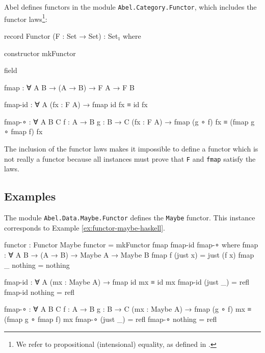 Abel defines functors in the module \texttt{Abel.Category.Functor},
which includes the functor laws\footnote{We refer to propositional
  (intensional) equality, as defined in \parencite[module
    \texttt{Relation.Binary.PropositionalEquality}]{danielsson-2013}.}:
\begin{codeagda}
  record Functor (F : Set → Set) : Set₁ where

    constructor mkFunctor

    field

      fmap    : ∀ {A B} → (A → B) → F A → F B

      fmap-id : ∀ {A} (fx : F A) → fmap id fx ≡ id fx

      fmap-∘  : ∀ {A B C} {f : A → B} {g : B → C}
                (fx : F A) → fmap (g ∘ f) fx ≡ (fmap g ∘ fmap f) fx
\end{codeagda}
The inclusion of the functor laws makes it impossible to define a
functor which is not really a functor because all instances must prove
that \texttt{F} and \texttt{fmap} satisfy the laws.


\subsection{Examples}
\label{sec:functors-agda-examples}

\begin{example}
  \label{ex:functors-agda-maybe}
  The module \texttt{Abel.Data.Maybe.Functor} defines the
  \texttt{Maybe} functor. This instance corresponds to Example
  \ref{ex:functor-maybe-haskell}.
  \begin{codeagda}
    functor : Functor Maybe
    functor = mkFunctor fmap fmap-id fmap-∘
      where
        fmap : ∀ {A B} → (A → B) → Maybe A → Maybe B
        fmap f (just x) = just (f x)
        fmap _ nothing  = nothing

        fmap-id : ∀ {A} (mx : Maybe A) → fmap id mx ≡ id mx
        fmap-id (just _) = refl
        fmap-id nothing  = refl

        fmap-∘ : ∀ {A B C} {f : A → B} {g : B → C}
                 (mx : Maybe A) → fmap (g ∘ f) mx ≡ (fmap g ∘ fmap f) mx
        fmap-∘ (just _) = refl
        fmap-∘ nothing  = refl
    \end{codeagda}
\end{example}

